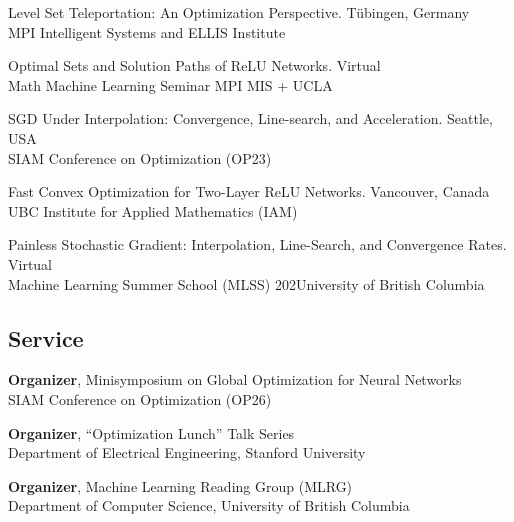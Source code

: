 \begin{description}[leftmargin=\mleftsize,style=nextline,font=\normalfont\space]
    \item[2024] Level Set Teleportation: An Optimization Perspective. \hfill Tübingen, Germany\\
          MPI Intelligent Systems and ELLIS Institute

    \item[2024] Optimal Sets and Solution Paths of ReLU Networks. \hfill Virtual\\
          Math Machine Learning Seminar MPI MIS + UCLA

    \item[2023] SGD Under Interpolation: Convergence, Line-search, and Acceleration. \hfill Seattle, USA\\
          SIAM Conference on Optimization (OP23)

    \item[2022] Fast Convex Optimization for Two-Layer ReLU Networks. \hfill Vancouver, Canada\\
          UBC Institute for Applied Mathematics (IAM)

    \item[2020] Painless Stochastic Gradient: Interpolation, Line-Search, and Convergence Rates. \hfill Virtual\\
          Machine Learning Summer School (MLSS) 202University of British Columbia\end{description}

\vspace{2ex}

\subsection{Service}

\begin{description}[leftmargin=\mleftsize,style=nextline,font=\normalfont\space]
    \item[2026] \textbf{Organizer}, Minisymposium on Global Optimization for Neural Networks \\
          SIAM Conference on Optimization (OP26)
    \item[2024] \textbf{Organizer}, ``Optimization Lunch'' Talk Series\\
          Department of Electrical Engineering, Stanford University
    \item[2019] \textbf{Organizer}, Machine Learning Reading Group (MLRG)\\
          Department of Computer Science, University of British Columbia
\end{description}

